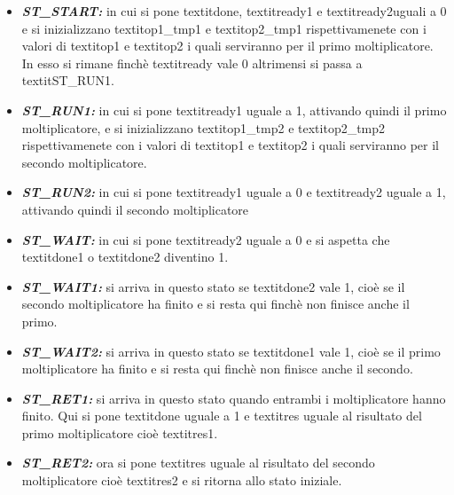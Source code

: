 \documentclass[]{IEEEtran}
\begin{document}
\begin{itemize}
    \item {\it\bf ST\_START:} in cui si pone textit{done}, textit{ready1} e textit{ready2}uguali a 0 e si inizializzano textit{op1\_tmp1} e textit{op2\_tmp1} rispettivamenete con i valori di textit{op1} e textit{op2} i quali serviranno per il primo moltiplicatore. In esso si rimane finchè textit{ready} vale 0 altrimensi si passa a textit{ST\_RUN1}.
    \item {\it\bf ST\_RUN1:} in cui si pone textit{ready1} uguale a 1, attivando quindi il primo moltiplicatore, e si inizializzano textit{op1\_tmp2} e textit{op2\_tmp2} rispettivamenete con i valori di textit{op1} e textit{op2} i quali serviranno per il secondo moltiplicatore.
    \item {\it\bf ST\_RUN2:} in cui si pone textit{ready1} uguale a 0 e textit{ready2} uguale a 1, attivando quindi il secondo moltiplicatore
    \item {\it\bf ST\_WAIT:} in cui si pone textit{ready2} uguale a 0 e si aspetta che textit{done1} o textit{done2} diventino 1.
    \item {\it\bf ST\_WAIT1:} si arriva in questo stato se textit{done2} vale 1, cioè se il secondo moltiplicatore ha finito e si resta qui finchè non finisce anche il primo.
    \item {\it\bf ST\_WAIT2:} si arriva in questo stato se textit{done1} vale 1, cioè se il primo moltiplicatore ha finito e si resta qui finchè non finisce anche il secondo.
    \item {\it\bf ST\_RET1:} si arriva in questo stato quando entrambi i moltiplicatore hanno finito. Qui si pone textit{done} uguale a 1 e textit{res} uguale al risultato del primo moltiplicatore cioè textit{res1}.
    \item {\it\bf ST\_RET2:} ora si pone textit{res} uguale al risultato del secondo moltiplicatore cioè textit{res2} e si ritorna allo stato iniziale.
\end{itemize}
\end{document}
